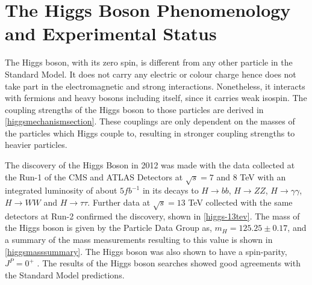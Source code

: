 \section{The Higgs Boson Phenomenology and Experimental Status}\label{higgs-status}

The Higgs boson, with its zero spin, is different from any other particle in the Standard Model. It does not carry any electric or colour charge hence does not take part in the electromagnetic and strong interactions. Nonetheless, it interacts with fermions and heavy bosons including itself, since it carries weak isospin. The coupling strengths of the Higgs boson to those particles are derived in \autoref{higgsmechanismsection}. These couplings are only dependent on the masses of the particles which Higgs couple to, resulting in stronger coupling strengths to heavier particles.

The discovery of the Higgs Boson in 2012 was made with the data collected at the Run-1 of the CMS and ATLAS Detectors at $\sqrt{s} = 7$ and $8$ TeV with an integrated luminosity of about $5 fb^{-1}$ in its decays to $H\rightarrow bb$, $H\rightarrow ZZ$, $H\rightarrow \gamma\gamma$, $H\rightarrow WW$ and $H\rightarrow \tau\tau$. Further data at $\sqrt{s} = 13$ TeV collected with the same detectors at Run-2 confirmed the discovery, shown in \autoref{higgs-13tev}. The mass of the Higgs boson is given by the Particle Data Group\cite{pdg} as, $ m_H = 125.25\pm 0.17$, and a summary of the mass measurements resulting to this value is shown in \autoref{higgsmasssummary}. The Higgs boson was also shown to have a spin-parity, $J^P=0^+$ \cite{higgs-spin}. The results of the Higgs boson searches showed good agreements with the Standard Model predictions.

